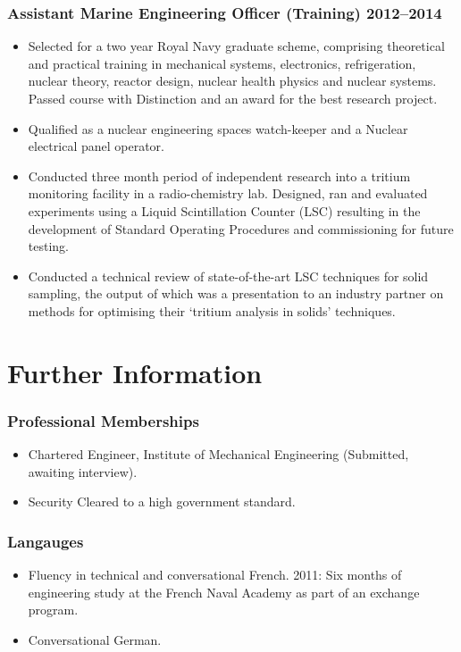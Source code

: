 \documentclass[a4paper, oneside, final, 11pt]{scrartcl} %
\begin{document}
\subsubsection*{Assistant Marine Engineering Officer (Training) \hfill 2012--2014}  
\normalfont
\begin{itemize}
	\item Selected for a two year Royal Navy graduate scheme, comprising theoretical and practical training in mechanical systems, electronics, refrigeration, nuclear theory, reactor design, nuclear health physics and nuclear systems. Passed course with Distinction and an award for the best research project. 
	\item Qualified as a nuclear engineering spaces watch-keeper and a Nuclear electrical panel operator. 
	\item Conducted  three month period of independent research into a tritium monitoring facility in a radio-chemistry lab. Designed, ran and evaluated experiments using a Liquid Scintillation Counter (LSC) resulting in the development of Standard Operating Procedures and commissioning for future testing. 
	\item Conducted a technical review of state-of-the-art LSC techniques for solid sampling, the output of which was a presentation to an industry partner on methods for optimising their `tritium analysis in solids' techniques.
\end{itemize}




\section{Further Information}
\subsubsection*{Professional Memberships}

\begin{itemize}	
\item Chartered Engineer, Institute of Mechanical Engineering (Submitted, awaiting interview).
\item Security Cleared to a high government standard.
\end{itemize}


\subsubsection*{Langauges}
\begin{itemize}	
\item Fluency in technical and conversational French. 2011: Six months of engineering study at the French Naval Academy as part of an exchange program. 
\item Conversational German. 
\end{itemize}
\end{document}

